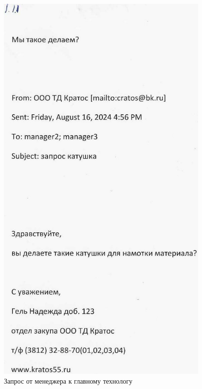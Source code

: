 \begin{figure}
\begin{center}
  \includegraphics[height=0.94\textheight, width=0.94\textwidth, keepaspectratio]{Pics 1/1.11 запрос от менеджеров к технологу_0001.jpg }
\end{center}
  \caption{Запрос от менеджера к главному технологу}
  \label{pic:1.11 запрос от менеджеров к технологу_0001}
\end{figure}

